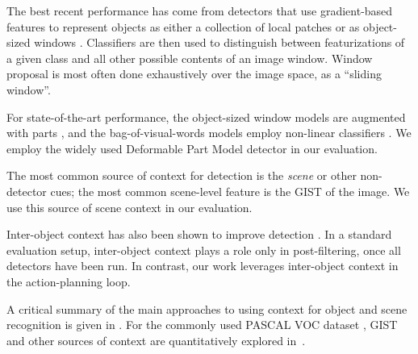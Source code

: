 The best recent performance has come from detectors that use gradient-based features to represent objects as either a collection of local patches or as object-sized windows \cite{Dalal2005,Lowe2004}.
Classifiers are then used to distinguish between featurizations of a given class and all other possible contents of an image window.
Window proposal is most often done exhaustively over the image space, as a ``sliding window''.

For state-of-the-art performance, the object-sized window models are augmented with parts \cite{Felzenszwalb2010a}, and the bag-of-visual-words models employ non-linear classifiers \cite{Vedaldi2009}.
We employ the widely used Deformable Part Model detector \cite{Felzenszwalb2010a} in our evaluation.




The most common source of context for detection is the \emph{scene} or other non-detector cues; the most common scene-level feature is the GIST \cite{Oliva2001a} of the image.
We use this source of scene context in our evaluation.

Inter-object context has also been shown to improve detection \cite{Torralba2004}.
In a standard evaluation setup, inter-object context plays a role only in post-filtering, once all detectors have been run.
In contrast, our work leverages inter-object context in the action-planning loop.

A critical summary of the main approaches to using context for object and scene recognition is given in \cite{Galleguillos2010}.
For the commonly used PASCAL VOC dataset \cite{pascal-voc-2010}, GIST and other sources of context are quantitatively explored in~\cite{Divvala2009}.

